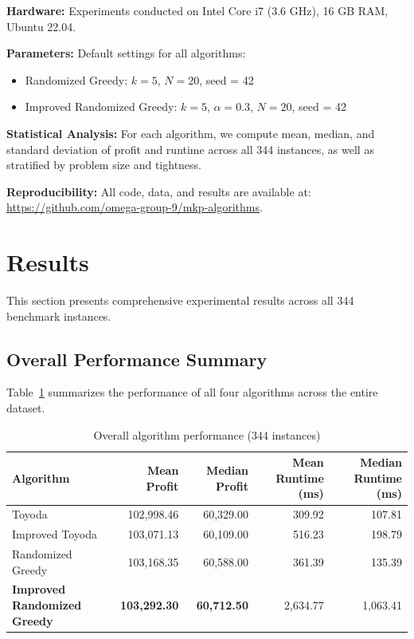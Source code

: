 \documentclass[12pt,a4paper]{article}
\begin{document}
\textbf{Hardware:} Experiments conducted on Intel Core i7 (3.6 GHz), 16 GB RAM, Ubuntu 22.04.

\textbf{Parameters:} Default settings for all algorithms:
\begin{itemize}
    \item Randomized Greedy: $k = 5$, $N = 20$, seed = 42
    \item Improved Randomized Greedy: $k = 5$, $\alpha = 0.3$, $N = 20$, seed = 42
\end{itemize}

\textbf{Statistical Analysis:} For each algorithm, we compute mean, median, and standard deviation of profit and runtime across all 344 instances, as well as stratified by problem size and tightness.

\textbf{Reproducibility:} All code, data, and results are available at: \url{https://github.com/omega-group-9/mkp-algorithms}.

\section{Results}
\label{sec:results}

This section presents comprehensive experimental results across all 344 benchmark instances.

\subsection{Overall Performance Summary}

Table~\ref{tab:overall} summarizes the performance of all four algorithms across the entire dataset.

\begin{table}[H]
\centering
\caption{Overall algorithm performance (344 instances)}
\label{tab:overall}
\begin{tabular}{lrrrr}
\toprule
\textbf{Algorithm} & \textbf{Mean Profit} & \textbf{Median Profit} & \textbf{Mean Runtime (ms)} & \textbf{Median Runtime (ms)} \\
\midrule
Toyoda & 102,998.46 & 60,329.00 & 309.92 & 107.81 \\
Improved Toyoda & 103,071.13 & 60,109.00 & 516.23 & 198.79 \\
Randomized Greedy & 103,168.35 & 60,588.00 & 361.39 & 135.39 \\
\textbf{Improved Randomized Greedy} & \textbf{103,292.30} & \textbf{60,712.50} & 2,634.77 & 1,063.41 \\
\bottomrule
\end{tabular}
\end{table}
\end{document}
